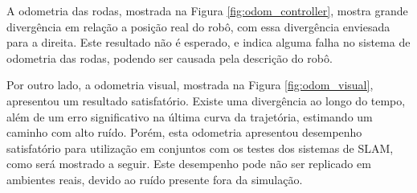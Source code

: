 \documentclass[repeatfields,xlists,xpacks,oneside,yearsonly]{ufrgscca}
\begin{document}
A odometria das rodas, mostrada na Figura \ref{fig:odom_controller},
mostra grande divergência em relação a posição real do robô, com essa
divergência enviesada para a direita. Este resultado não é esperado,
e indica alguma falha no sistema de odometria das rodas, podendo ser
causada pela descrição do robô. 

Por outro lado, a odometria visual, mostrada na Figura
\ref{fig:odom_visual}, apresentou um resultado satisfatório. Existe
uma divergência ao longo do tempo, além de um erro significativo na
última curva da trajetória, estimando um caminho com alto ruído.
Porém, esta odometria apresentou desempenho satisfatório para
utilização em conjuntos com os testes dos sistemas de SLAM, como será
mostrado a seguir. Este desempenho pode não ser replicado em
ambientes reais, devido ao ruído presente fora da simulação.
\end{document}
